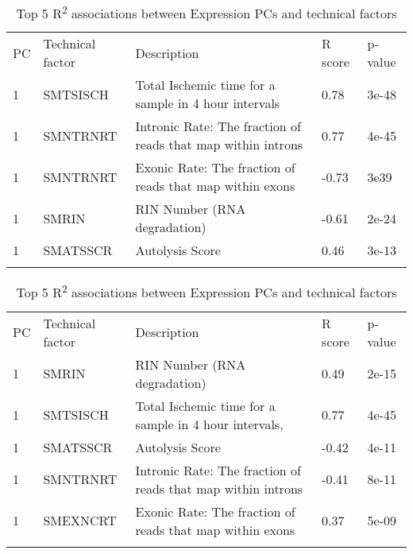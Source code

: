 \documentclass[graybox]{svmult}
\begin{document}
\begin{table}
\caption{Top 5 R\textsuperscript{2} associations between Expression PCs and technical factors}
\label{tab:expression_pcs_and_tfs}       %
%

\begin{tabular}{p{1cm}p{2.4cm}p{8cm}p{1cm}p{1cm}}
\hline\noalign{\smallskip}
 PC & Technical factor & Description & R score & p-value  \\
\noalign{\smallskip}\svhline\noalign{\smallskip}
1 & SMTSISCH & Total Ischemic time for a sample in 4 hour intervals & 0.78 & 3e-48\\
1 & SMNTRNRT & Intronic Rate: The fraction of reads that map within introns & 0.77 & 4e-45\\
1 & SMNTRNRT & Exonic Rate: The fraction of reads that map within exons & -0.73 & 3e39 \\
1 & SMRIN & RIN Number (RNA degradation) & -0.61 & 2e-24 \\
1 & SMATSSCR & Autolysis Score & 0.46 & 3e-13 \\
\noalign{\smallskip}\hline\noalign{\smallskip}
\end{tabular}
\end{table}

\begin{table}
\caption{Top 5 R\textsuperscript{2} associations between Expression PCs and technical factors}
\label{tab:image_feature_pcs_and_tfs}       %

\begin{tabular}{p{1cm}p{2.4cm}p{8cm}p{1cm}p{1cm}}
\hline\noalign{\smallskip}
PC & Technical factor & Description & R score & p-value  \\
\noalign{\smallskip}\svhline\noalign{\smallskip}
1 & SMRIN & RIN Number (RNA degradation) & 0.49 & 2e-15\\
1 & SMTSISCH & Total Ischemic time for a sample in 4 hour intervals, & 0.77 & 4e-45\\
1 & SMATSSCR & Autolysis Score & -0.42 & 4e-11 \\
1 & SMNTRNRT & Intronic Rate: The fraction of reads that map within introns & -0.41 & 8e-11 \\
1 & SMEXNCRT & Exonic Rate: The fraction of reads that map within exons & 0.37 & 5e-09 \\
\noalign{\smallskip}\hline\noalign{\smallskip}
\end{tabular}
\end{table}



%
\end{document}
